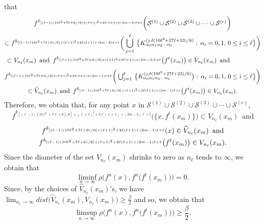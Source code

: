 \documentclass[12pt]{article}
\newcommand{\al}{\alpha}
\begin{document}
that 
\begin{multline*}
$$
f^{k_{[(\ell-1)(10\ell^2+7\ell+6)/6]+(\ell+1)^2+2\ell(\ell+1)+(2m-2)\ell+t}}\bigg(\mathcal S^{(1)} \cup \mathcal S^{(2)} \cup \mathcal S^{(3)} \cup \cdots \cup \mathcal S^{(r)}\bigg) \\
\subset f^{k_{[(\ell-1)(10\ell^2+7\ell+6)/6]+(\ell+1)^2+2\ell(\ell+1)+(2m-2)\ell+t}}\bigg(\bigcup_{j=1}^\ell \, \big\{ K_{\al_0\al_1\al_2\cdots\al_\ell}^{(j, \ell(10\ell^2+27\ell+23)/6)}: \, \al_i = 0, 1, \, 0 \le i \le \ell \big\}\bigg) \\ 
\subset V_{n_\ell}(x_m) \,\,\, \text{and} \,\,\, f^{k_{[(\ell-1)(10\ell^2+7\ell+6)/6]+(\ell+1)^2+2\ell(\ell+1)+(2m-2)\ell+t}}\big(f^t(x_m)\big) \in V_{n_\ell}(x_m) \,\,\, \text{and} \qquad\qquad\,\,\,
$$
\end{multline*}
\begin{multline*}
$$
f^{k_{[(\ell-1)(10\ell^2+7\ell+6)/6]+(\ell+1)^2+2\ell(\ell+1)+(2m-1)\ell+t}}\bigg(\bigcup_{j=1}^\ell \, \big\{ K_{\al_0\al_1\al_2\cdots\al_\ell}^{(j, \ell(10\ell^2+27\ell+23)/6)}\big): \, \al_i = 0, 1, \, 0 \le i \le \ell \big\}\bigg) \\ 
\subset \widehat V_{n_\ell}(x_m) \,\,\, \text{and} \,\,\, f^{k_{[(\ell-1)(10\ell^2+7\ell+6)/6]+(\ell+1)^2+2\ell(\ell+1)+(2m-1)\ell+t}}\big(f^t(x_m)\big) \in V_{n_\ell}(x_m).
$$
\end{multline*}
Therefore, we obtain that, for any point $x$ in $\mathcal S^{(1)} \cup \mathcal S^{(2)} \cup \mathcal S^{(3)} \cup \cdots \cup \mathcal S^{(r)}$,  
$$
f^{k_{[(\ell-1)(10\ell^2+7\ell+6)/6]+(\ell+1)^2+2\ell(\ell+1)+(2m-2)\ell+t}}\big(\{ x, f^t(x_m) \}\big) \subset V_{n_\ell}(x_m) \,\,\, \text{and}
$$
\begin{multline*}
$$
f^{k_{[(\ell-1)(10\ell^2+7\ell+6)/6]+(\ell+1)^2+2\ell(\ell+1)+(2m-1)\ell+t}}(x) \in \widehat V_{n_\ell}(x_m) \,\,\, \text{and} \\ f^{k_{[(\ell-1)(10\ell^2+7\ell+6)/6]+(\ell+1)^2+2\ell(\ell+1)+(2m-1)\ell+t}}\big(f^t(x_m)\big) \in V_{n_\ell}(x_m).
$$
\end{multline*}
\indent Since the diameter of the set $V_{n_\ell}(x_m)$ shrinks to zero as $n_\ell$ tends to $\infty$, we obtain that 
$$
\liminf_{n \to \infty} \rho\bigg(f^n(x), f^n\big(f^t(x_m)\big)\bigg) = 0.
$$
\indent Since, by the choices of $\widehat V_{n_\ell}(x_m)$'s, we have $\lim_{n_\ell \to \infty} dist\big(\widehat V_{n_\ell}(x_m), V_{n_\ell}(x_m)\big) \ge \frac \beta2$ and so, we obtain that 
$$
\limsup_{n \to \infty} \rho\bigg(f^n(x), f^n\big(f^t(x_m)\big)\bigg) \ge \frac \beta2.
$$
\end{document}
